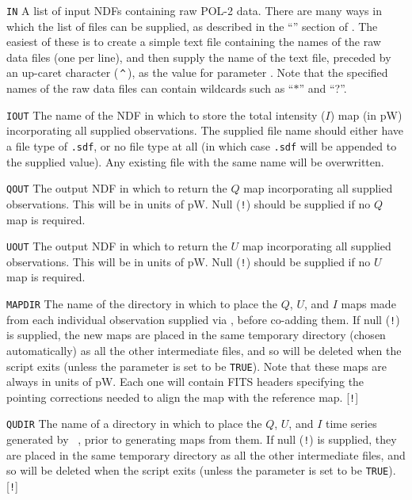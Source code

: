 \begin{aligndesc}
\item[\texttt{IN}] A list of input NDFs containing raw POL-2 data.
  There are many ways in which the list of files can be supplied, as
  described in the ``'' section of . The
  easiest of these is to create a simple text file containing the names of the
  raw data files (one per line), and then supply the name of the
  text file, preceded by an up-caret character (\,\texttt{\^{}}\,), as
  the value for parameter . Note that the specified names of the raw
  data files can contain wildcards such as ``$*$'' and ``?''.

\item[\texttt{IOUT}] The name of the NDF in which to store the
  total intensity ($I$) map (in pW) incorporating all supplied observations.
  The supplied file name should either have a file type of
  \texttt{.sdf}, or no file type at all (in which case
  \texttt{.sdf} will be appended to the supplied value). Any existing
  file with the same name will be overwritten.

\item[\texttt{QOUT}] The output NDF in which to return the $Q$ map
  incorporating all supplied observations. This will be in units of
  pW. Null (\texttt{!}) should be supplied if no $Q$ map is required.

\item[\texttt{UOUT}] The output NDF in which to return the $U$ map
  incorporating all supplied observations. This will be in units of
  pW. Null (\texttt{!}) should be supplied if no $U$ map is required.

\item[\texttt{MAPDIR}] The name of the directory in which to place the $Q$,
  $U$, and $I$ maps made from each individual observation supplied via
  , before co-adding them. If null (\texttt{!}) is supplied, the new
  maps are placed in the same temporary directory (chosen automatically)
  as all the other intermediate files, and so will be deleted when the script
  exits (unless the parameter  is set to be \texttt{TRUE}). Note
  that these maps are always in units of pW. Each one will contain FITS
  headers specifying the pointing corrections needed to align the map with
  the reference map. [\texttt{!}]

\item[\texttt{QUDIR}] The name of a directory in which to place the $Q$, $U$,
  and $I$ time series generated by \SMURF\ , prior to generating
  maps from them. If null (\texttt{!}) is supplied, they are placed in the same
  temporary directory as all the other intermediate files, and so will
  be deleted when the script exits (unless the parameter  is
  set to be \texttt{TRUE}). [\texttt{!}]
\end{aligndesc}

